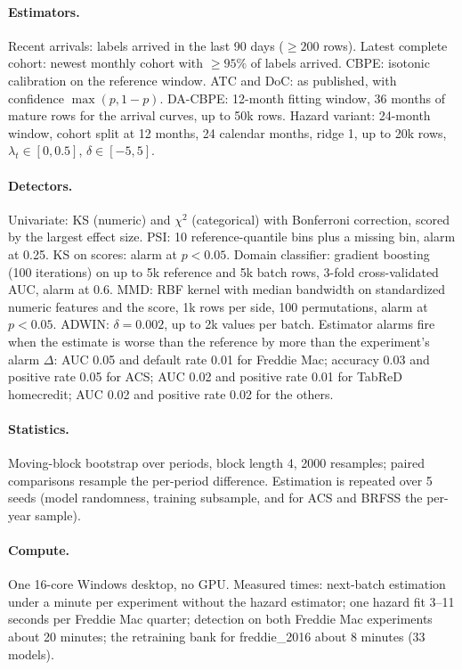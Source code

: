 \documentclass[11pt]{article}
\begin{document}
\paragraph{Estimators.} Recent arrivals: labels arrived in the last 90 days ($\ge 200$ rows). Latest
complete cohort: newest monthly cohort with $\ge 95\%$ of labels arrived. CBPE: isotonic calibration
on the reference window. ATC and DoC: as published, with confidence $\max(p, 1-p)$. DA-CBPE: 12-month
fitting window, 36 months of mature rows for the arrival curves, up to 50k rows. Hazard variant:
24-month window, cohort split at 12 months, 24 calendar months, ridge 1, up to 20k rows,
$\lambda_t \in [0, 0.5]$, $\delta \in [-5, 5]$.

\paragraph{Detectors.} Univariate: KS (numeric) and $\chi^2$ (categorical) with Bonferroni correction,
scored by the largest effect size. PSI: 10 reference-quantile bins plus a missing bin, alarm at 0.25.
KS on scores: alarm at $p < 0.05$. Domain classifier: gradient boosting (100 iterations) on up to 5k
reference and 5k batch rows, 3-fold cross-validated AUC, alarm at 0.6. MMD: RBF kernel with median
bandwidth on standardized numeric features and the score, 1k rows per side, 100 permutations, alarm at
$p < 0.05$. ADWIN: $\delta = 0.002$, up to 2k values per batch. Estimator alarms fire when the estimate
is worse than the reference by more than the experiment's alarm $\Delta$: AUC 0.05 and default rate
0.01 for Freddie Mac; accuracy 0.03 and positive rate 0.05 for ACS; AUC 0.02 and positive rate 0.01
for TabReD homecredit; AUC 0.02 and positive rate 0.02 for the others.

\paragraph{Statistics.} Moving-block bootstrap over periods, block length 4, 2000 resamples; paired
comparisons resample the per-period difference. Estimation is repeated over 5 seeds (model
randomness, training subsample, and for ACS and BRFSS the per-year sample).

\paragraph{Compute.} One 16-core Windows desktop, no GPU. Measured times: next-batch estimation
under a minute per experiment without the hazard estimator; one hazard fit 3--11 seconds per
Freddie Mac quarter; detection on both Freddie Mac experiments about 20 minutes; the retraining bank
for freddie\_2016 about 8 minutes (33 models).
\end{document}
